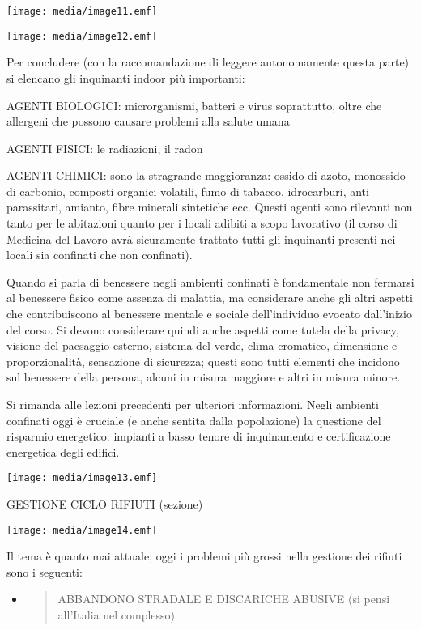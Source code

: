 \documentclass[]{article}
\begin{document}
\texttt{[image: media/image11.emf]}

\texttt{[image: media/image12.emf]}

Per concludere (con la raccomandazione di leggere autonomamente questa
parte) si elencano gli inquinanti indoor più importanti:

AGENTI BIOLOGICI: microrganismi, batteri e virus soprattutto, oltre che
allergeni che possono causare problemi alla salute umana

AGENTI FISICI: le radiazioni, il radon

AGENTI CHIMICI: sono la stragrande maggioranza: ossido di azoto,
monossido di carbonio, composti organici volatili, fumo di tabacco,
idrocarburi, anti parassitari, amianto, fibre minerali sintetiche ecc.
Questi agenti sono rilevanti non tanto per le abitazioni quanto per i
locali adibiti a scopo lavorativo (il corso di Medicina del Lavoro avrà
sicuramente trattato tutti gli inquinanti presenti nei locali sia
confinati che non confinati).

Quando si parla di benessere negli ambienti confinati è fondamentale non
fermarsi al benessere fisico come assenza di malattia, ma considerare
anche gli altri aspetti che contribuiscono al benessere mentale e
sociale dell'individuo evocato dall'inizio del corso. Si devono
considerare quindi anche aspetti come tutela della privacy, visione del
paesaggio esterno, sistema del verde, clima cromatico, dimensione e
proporzionalità, sensazione di sicurezza; questi sono tutti elementi che
incidono sul benessere della persona, alcuni in misura maggiore e altri
in misura minore.

Si rimanda alle lezioni precedenti per ulteriori informazioni. Negli
ambienti confinati oggi è cruciale (e anche sentita dalla popolazione)
la questione del risparmio energetico: impianti a basso tenore di
inquinamento e certificazione energetica degli edifici.

\texttt{[image: media/image13.emf]}

GESTIONE CICLO RIFIUTI (sezione)

\texttt{[image: media/image14.emf]}

Il tema è quanto mai attuale; oggi i problemi più grossi nella gestione
dei rifiuti sono i seguenti:

\begin{itemize}
\item
  \begin{quote}
  ABBANDONO STRADALE E DISCARICHE ABUSIVE (si pensi all'Italia nel
  complesso)
  \end{quote}
\end{itemize}
\end{document}
